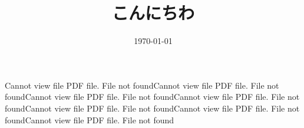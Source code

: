 \documentclass[a4paper,11pt]{jsarticle}
\begin{document}
\title{こんにちわ}
\author{}
\date{\today}
\maketitle
Cannot view file PDF file. File not foundCannot view file PDF file. File not foundCannot view file PDF file. File not foundCannot view file PDF file. File not foundCannot view file PDF file. File not foundCannot view file PDF file. File not foundCannot view file PDF file. File not found
\end{document}
